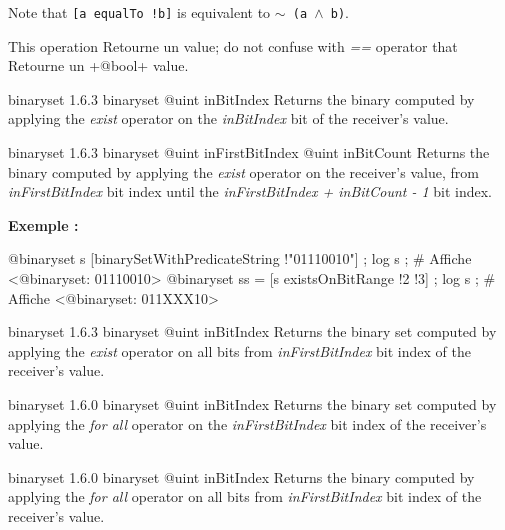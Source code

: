 Note that \texttt{[a equalTo !b]} is equivalent to \texttt{$\sim$ (a $\wedge$ b)}.

This operation Retourne un  value; do not confuse with \emph{==} operator that Retourne un \ggs+@bool+ value.







{binaryset}
{1.6.3}
{binaryset}
{@uint inBitIndex}
{Returns the binary computed by applying the \emph{exist} operator on the \emph{inBitIndex} bit of the receiver's value.}
{}







{binaryset}
{1.6.3}
{binaryset}
{@uint inFirstBitIndex}
{@uint inBitCount}
{Returns the binary computed by applying the \emph{exist} operator on the receiver's value, from \emph{inFirstBitIndex} bit index until the \emph{inFirstBitIndex + inBitCount - 1} bit index.}
{}


\textbf{Exemple :}
\begin{galgascode}
@binaryset s [binarySetWithPredicateString !"01110010"] ;
log s ; # Affiche <@binaryset: 01110010>
@binaryset ss = [s existsOnBitRange !2 !3] ;
log s ; # Affiche <@binaryset: 011XXX10>
\end{galgascode}







{binaryset}
{1.6.3}
{binaryset}
{@uint inBitIndex}
{Returns the binary set computed by applying the \emph{exist} operator on all bits from \emph{inFirstBitIndex} bit index of the receiver's value.}
{}







{binaryset}
{1.6.0}
{binaryset}
{@uint inBitIndex}
{Returns the binary set computed by applying the \emph{for all} operator on the \emph{inFirstBitIndex} bit index of the receiver's value.}
{}







{binaryset}
{1.6.0}
{binaryset}
{@uint inBitIndex}
{Returns the binary computed by applying the \emph{for all} operator on all bits from \emph{inFirstBitIndex} bit index of the receiver's value.}
{}








